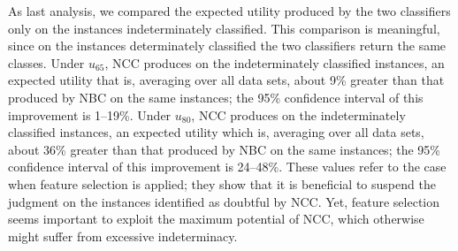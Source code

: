 \documentclass[a4paper,10pt,reqno]{amsart}
\theoremstyle{remark}
\begin{document}
As last analysis, we compared the expected utility produced by the two classifiers only on the instances indeterminately classified. This comparison is meaningful, since on the instances determinately classified the two classifiers return the same classes.
Under $u_{65}$, NCC produces on the indeterminately classified instances, an expected utility that is, averaging over all data sets, about 9\% greater than that produced by NBC on the same instances; the 95\% confidence interval of this improvement is 1--19\%. 
Under $u_{80}$, NCC produces on the indeterminately classified instances, an expected utility which is, averaging over all data sets, about 36\% greater than that produced by NBC on the same instances; the 95\% confidence interval of this improvement is 24--48\%.
These values refer to the case when feature selection is applied; they show that it is beneficial to suspend the judgment on the instances identified as doubtful by NCC.
Yet, feature selection seems important to exploit the maximum potential of NCC, which otherwise might suffer from excessive indeterminacy.
 




%   
\end{document}
